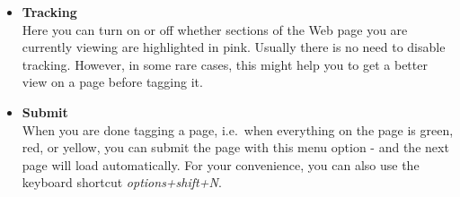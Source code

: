 \documentclass[12pt,a4paper]{article}
\begin{document}
\begin{itemize}
	\item {\large \textbf{Tracking}}\\
Here you can turn on or off whether sections of the Web page you are currently viewing are highlighted in pink. Usually there is no need to disable tracking. However, in some rare cases, this might help you to get a better view on a page before tagging it. \\
	\item {\large \textbf{Submit}}\\
When you are done tagging a page, i.e.~when everything on the page is green, red, or yellow, you can submit the page with this menu option - and the next page will load automatically. For your convenience, you can also use the keyboard shortcut \emph{options+shift+N}. \\


\end{itemize}
\end{document}
